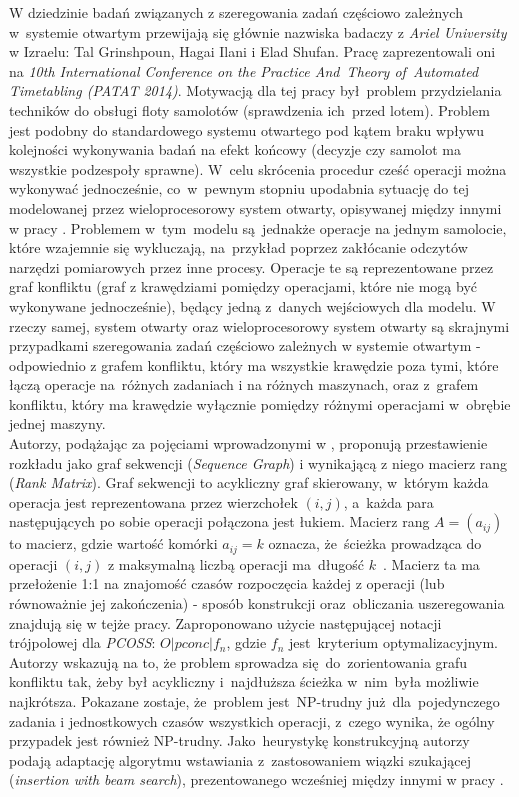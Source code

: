 \documentclass[brudnopis]{xmgr}
\begin{document}
W dziedzinie badań związanych z szeregowania zadań częściowo zależnych w~systemie otwartym przewijają się głównie nazwiska badaczy z \emph{Ariel University} w Izraelu: Tal Grinshpoun, Hagai Ilani i Elad Shufan. Pracę \cite{grinshpoun2014partially} zaprezentowali oni na \emph{10th International Conference on the Practice And~Theory of~Automated Timetabling (PATAT 2014)}. Motywacją dla tej pracy był~problem przydzielania techników do obsługi floty samolotów (sprawdzenia ich~przed lotem). Problem jest podobny do standardowego systemu otwartego pod kątem braku wpływu kolejności wykonywania badań na efekt końcowy (decyzje czy samolot ma wszystkie podzespoły sprawne). W~celu skrócenia procedur cześć operacji można wykonywać jednocześnie, co~w~pewnym stopniu upodabnia sytuację do tej modelowanej przez wieloprocesorowy system otwarty, opisywanej między innymi w pracy \cite{adakmultiprocessor}. Problemem w~tym~modelu są~jednakże operacje na jednym samolocie, które wzajemnie się wykluczają, na~przykład poprzez zakłócanie odczytów narzędzi pomiarowych przez inne procesy. Operacje te są reprezentowane przez graf konfliktu (graf z krawędziami pomiędzy operacjami, które nie mogą być wykonywane jednocześnie), będący jedną z~danych wejściowych dla modelu. W rzeczy samej, system otwarty oraz wieloprocesorowy system otwarty są skrajnymi przypadkami szeregowania zadań częściowo zależnych w systemie otwartym - odpowiednio z grafem konfliktu, który ma wszystkie krawędzie poza tymi, które łączą operacje na~różnych zadaniach i na różnych maszynach, oraz z~grafem konfliktu, który ma krawędzie wyłącznie pomiędzy różnymi operacjami w~obrębie jednej maszyny.\\
Autorzy, podążając za pojęciami wprowadzonymi w \cite{brasel2006matrices}, proponują przestawienie rozkładu jako graf sekwencji (\emph{Sequence Graph}) i wynikającą z niego macierz rang (\emph{Rank Matrix}). Graf sekwencji to acykliczny graf skierowany, w~którym każda operacja jest reprezentowana przez wierzchołek $(i, j)$, a~każda para następujących po sobie operacji połączona jest łukiem. Macierz rang $A = (a_{ij})$ to macierz, gdzie wartość komórki $a_{ij} = k$ oznacza, że~ścieżka prowadząca do operacji $(i, j)$ z maksymalną liczbą operacji ma~długość $k$~\cite{brasel2008heuristic}. Macierz ta ma przełożenie 1:1 na znajomość czasów rozpoczęcia każdej z operacji (lub równoważnie jej zakończenia) - sposób konstrukcji oraz~obliczania uszeregowania znajdują się w tejże pracy. Zaproponowano użycie następującej notacji trójpolowej dla \emph{PCOSS}: $O|pconc|f_n$, gdzie $f_n$ jest~kryterium optymalizacyjnym. Autorzy wskazują na to, że problem sprowadza się~do~zorientowania grafu konfliktu tak, żeby był acykliczny i~najdłuższa ścieżka w~nim~była możliwie najkrótsza. Pokazane zostaje, że~problem jest~NP-trudny już~dla~pojedynczego zadania i jednostkowych czasów wszystkich operacji, z~czego wynika, że ogólny przypadek jest również NP-trudny. Jako~heurystykę konstrukcyjną autorzy podają adaptację algorytmu wstawiania z~zastosowaniem wiązki szukającej (\emph{insertion with beam search}), prezentowanego wcześniej między innymi w pracy \cite{brasel1993constructive}.
\medskip
\end{document}
